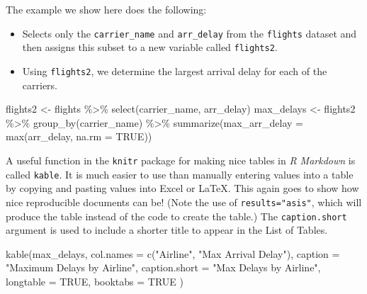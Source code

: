 \documentclass[12pt,twoside]{reedthesis}
\newenvironment{Shaded}{\begin{snugshade}}{\end{snugshade}}
\newcommand{\AttributeTok}[1]{\textcolor[rgb]{0.77,0.63,0.00}{#1}}
\newcommand{\ConstantTok}[1]{\textcolor[rgb]{0.00,0.00,0.00}{#1}}
\newcommand{\FunctionTok}[1]{\textcolor[rgb]{0.00,0.00,0.00}{#1}}
\newcommand{\NormalTok}[1]{#1}
\newcommand{\OtherTok}[1]{\textcolor[rgb]{0.56,0.35,0.01}{#1}}
\newcommand{\SpecialCharTok}[1]{\textcolor[rgb]{0.00,0.00,0.00}{#1}}
\newcommand{\StringTok}[1]{\textcolor[rgb]{0.31,0.60,0.02}{#1}}
\begin{document}
The example we show here does the following:
\begin{itemize}
\item
  Selects only the \texttt{carrier\_name} and \texttt{arr\_delay} from the \texttt{flights} dataset and then assigns this subset to a new variable called \texttt{flights2}.
\item
  Using \texttt{flights2}, we determine the largest arrival delay for each of the carriers.
\end{itemize}
\begin{Shaded}
\begin{Highlighting}[]
\NormalTok{flights2 }\OtherTok{\textless{}{-}}\NormalTok{ flights }\SpecialCharTok{\%\textgreater{}\%}
  \FunctionTok{select}\NormalTok{(carrier\_name, arr\_delay)}
\NormalTok{max\_delays }\OtherTok{\textless{}{-}}\NormalTok{ flights2 }\SpecialCharTok{\%\textgreater{}\%}
  \FunctionTok{group\_by}\NormalTok{(carrier\_name) }\SpecialCharTok{\%\textgreater{}\%}
  \FunctionTok{summarize}\NormalTok{(}\AttributeTok{max\_arr\_delay =} \FunctionTok{max}\NormalTok{(arr\_delay, }\AttributeTok{na.rm =} \ConstantTok{TRUE}\NormalTok{))}
\end{Highlighting}
\end{Shaded}
A useful function in the \texttt{knitr} package for making nice tables in \emph{R Markdown} is called \texttt{kable}. It is much easier to use than manually entering values into a table by copying and pasting values into Excel or LaTeX. This again goes to show how nice reproducible documents can be! (Note the use of \texttt{results="asis"}, which will produce the table instead of the code to create the table.) The \texttt{caption.short} argument is used to include a shorter title to appear in the List of Tables.
\begin{Shaded}
\begin{Highlighting}[]
\FunctionTok{kable}\NormalTok{(max\_delays,}
  \AttributeTok{col.names =} \FunctionTok{c}\NormalTok{(}\StringTok{"Airline"}\NormalTok{, }\StringTok{"Max Arrival Delay"}\NormalTok{),}
  \AttributeTok{caption =} \StringTok{"Maximum Delays by Airline"}\NormalTok{,}
  \AttributeTok{caption.short =} \StringTok{"Max Delays by Airline"}\NormalTok{,}
  \AttributeTok{longtable =} \ConstantTok{TRUE}\NormalTok{,}
  \AttributeTok{booktabs =} \ConstantTok{TRUE}
\NormalTok{)}
\end{Highlighting}
\end{Shaded}
\end{document}
